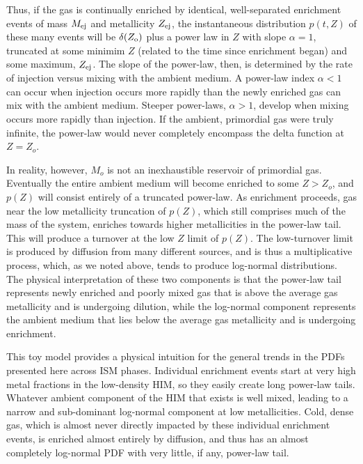 Thus, if the gas is continually enriched by identical, well-separated enrichment events of mass $M_{\rm ej}$ and metallicity $Z_{\rm ej}$, the instantaneous distribution $p(t,Z)$
of these many events will be $\delta(Z_{\rm o})$ plus a power law in $Z$ with slope $\alpha = 1$, truncated at some minimim $Z$ (related to the time since enrichment began) and some maximum, $Z_{\rm ej}$.
The slope of the power-law, then, is determined by the rate of injection versus mixing with the ambient medium. A power-law index $\alpha < 1$ can occur when injection occurs more rapidly than the newly enriched gas can mix with the ambient medium. Steeper power-laws, $\alpha > 1$, develop when mixing occurs more rapidly than
         injection.
If the ambient, primordial gas were truly infinite, the power-law would never completely encompass the delta function at $Z = Z_o$.

In reality, however, $M_o$ is not an inexhaustible reservoir of primordial gas. Eventually the entire ambient medium will become enriched to some $Z > Z_o$, and $p(Z)$ will consist entirely of a truncated power-law. As enrichment proceeds, gas near the low metallicity truncation of $p(Z)$, which still comprises much of the mass of the system, enriches towards higher metallicities in the power-law tail. This will produce a turnover at the low $Z$ limit of $p(Z)$. The low-turnover limit is produced by diffusion from many different sources, and is thus a multiplicative process, which, as we noted above, tends to produce log-normal distributions.
The physical interpretation of these two components is that the power-law tail represents newly enriched and poorly mixed gas that is above the average gas metallicity and is undergoing dilution, while the log-normal component represents the ambient medium that lies below the average gas metallicity and is undergoing enrichment.

This toy model provides a physical intuition for the general trends in the PDFs presented here across ISM phases.
     Individual enrichment events start at very high metal fractions in the low-density HIM,
     so they easily create long power-law tails.
Whatever ambient component of the HIM that exists is well mixed, leading to a narrow and sub-dominant log-normal component at low metallicities. Cold, dense gas, which is almost never directly impacted by these individual enrichment events, is enriched almost entirely by diffusion, and thus has an almost completely log-normal PDF with very little, if any, power-law tail.

